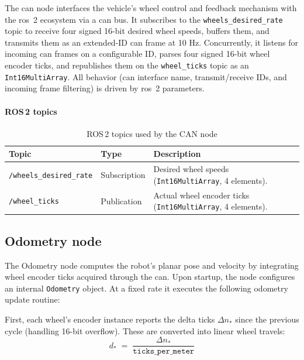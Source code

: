 The \gls{can} node interfaces the vehicle's wheel control and feedback mechanism with the \gls{ros}~2 ecosystem via a \gls{can} bus. It subscribes to the \texttt{wheels\_desired\_rate} topic to receive four signed 16-bit desired wheel speeds, buffers them, and transmits them as an extended-ID \gls{can} frame at 10 Hz. Concurrently, it listens for incoming \gls{can} frames on a configurable ID, parses four signed 16-bit wheel encoder ticks, and republishes them on the \texttt{wheel\_ticks} topic as an \texttt{Int16MultiArray}. All behavior (\gls{can} interface name, transmit/receive IDs, and incoming frame filtering) is driven by \gls{ros}~2 parameters.

\paragraph*{ROS\,2 topics}
\begin{table}[H]
  \centering
  \begin{tabular}{lll}
    \toprule
    \textbf{Topic}                  & \textbf{Type}                                                      & \textbf{Description} \\
    \midrule
    \texttt{/wheels\_desired\_rate} & Subscription
                                    & Desired wheel speeds (\texttt{Int16MultiArray}, 4 elements).                            \\
    \texttt{/wheel\_ticks}          & Publication
                                    & Actual wheel encoder ticks (\texttt{Int16MultiArray}, 4 elements).                      \\
    \bottomrule
  \end{tabular}
  \caption{ROS\,2 topics used by the CAN node}
  \label{tab:can-topics}
\end{table}

\subsection{Odometry node}

The Odometry node computes the robot's planar pose and velocity by integrating wheel encoder ticks acquired through the \gls{can}. Upon startup, the node configures an internal \texttt{Odometry} object. At a fixed rate it executes the following odometry update routine:

First, each wheel's encoder instance reports the delta ticks $\Delta n_*$ since the previous cycle (handling 16-bit overflow). These are converted into linear wheel travels:
\begin{equation}
  d_* \;=\; \frac{\Delta n_*}{\mathtt{ticks\_per\_meter}}
\end{equation}

